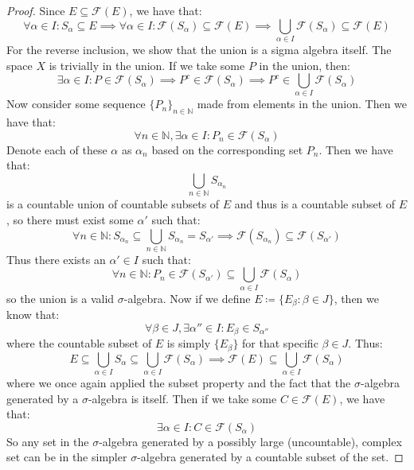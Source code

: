 \documentclass[10pt,letterpaper]{article} %
\begin{document}
\begin{proof}
Since $E \subseteq \mathcal{F}(E)$, we have that:
\begin{equation*}
\forall \alpha \in I: S_\alpha \subseteq E \implies \forall \alpha \in I: \mathcal{F}(S_\alpha) \subseteq \mathcal{F}(E) \implies \bigcup_{\alpha \in I}\mathcal{F}(S_\alpha) \subseteq \mathcal{F}(E)
\end{equation*}
For the reverse inclusion, we show that the union is a sigma algebra itself. The space $X$ is trivially in the union. If we take some $P$ in the union, then:
\begin{equation*}
\exists \alpha \in I: P \in \mathcal{F}(S_\alpha) \implies P^c \in \mathcal{F}(S_\alpha) \implies P^c \in \bigcup_{\alpha \in I}\mathcal{F}(S_\alpha)
\end{equation*}
Now consider some sequence $\{P_n\}_{n \in \mathbb{N}}$ made from elements in the union. Then we have that:
\begin{equation*}
\forall n \in \mathbb{N}, \exists \alpha \in I: P_n \in \mathcal{F}(S_\alpha)
\end{equation*}
Denote each of these $\alpha$ as $\alpha_n$ based on the corresponding set $P_n$. Then we have that:
\begin{equation*}
\bigcup_{n \in \mathbb{N}}S_{\alpha_n}
\end{equation*}
is a countable union of countable subsets of $E$ and thus is a countable subset of $E$, so there must exist some $\alpha'$ such that:
\begin{equation*}
\forall n \in \mathbb{N}: S_{\alpha_n} \subseteq \bigcup_{n \in \mathbb{N}}S_{\alpha_n} = S_{\alpha'} \implies \mathcal{F}(S_{\alpha_n}) \subseteq \mathcal{F}(S_{\alpha'})
\end{equation*}
Thus there exists an $\alpha' \in I$ such that:
\begin{equation*}
\forall n \in \mathbb{N}: P_n \in \mathcal{F}(S_{\alpha'}) \subseteq \bigcup_{\alpha \in I}\mathcal{F}(S_\alpha)
\end{equation*}
so the union is a valid $\sigma$-algebra. Now if we define $E \coloneq \{E_\beta : \beta \in J\}$, then we know that:
\begin{equation*}
\forall \beta \in J, \exists \alpha'' \in I: E_\beta \in S_{\alpha''}
\end{equation*}
where the countable subset of $E$ is simply $\{E_\beta\}$ for that specific $\beta \in J$. Thus:
\begin{equation*}
E \subseteq \bigcup_{\alpha \in I}S_{\alpha} \subseteq \bigcup_{\alpha \in I}\mathcal{F}(S_\alpha) \implies \mathcal{F}(E) \subseteq \bigcup_{\alpha \in I}\mathcal{F}(S_\alpha)
\end{equation*}
where we once again applied the subset property and the fact that the $\sigma$-algebra generated by a $\sigma$-algebra is itself. Then if we take some $C \in \mathcal{F}(E)$, we have that:
\begin{equation*}
\exists \alpha \in I: C \in \mathcal{F}(S_\alpha)
\end{equation*}
So any set in the $\sigma$-algebra generated by a possibly large (uncountable), complex set can be in the simpler $\sigma$-algebra generated by a countable subset of the set.
\end{proof}
\end{document}

